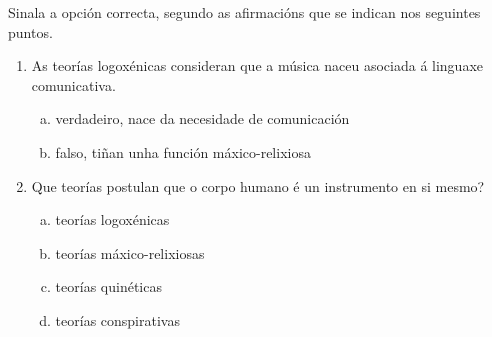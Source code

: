 
\begin{ejercicio}
Sinala a opción correcta, segundo as afirmacións que se indican nos seguintes puntos.
\begin{enumerate}[1)]
 \item 
 As teorías logoxénicas consideran que a música naceu asociada á linguaxe comunicativa.
  \begin{enumerate}[a)]
   \item \label{sol:3}
   verdadeiro, nace da necesidade de comunicación
   \item 
   falso, tiñan unha función máxico-relixiosa
  \end{enumerate}
  \item
  Que teorías postulan que o corpo humano é un instrumento en si mesmo? 
  \begin{enumerate}[a)]
   \item 
   teorías logoxénicas
   \item 
   teorías máxico-relixiosas
   \item \label{sol:4}
   teorías quinéticas
   \item 
   teorías conspirativas
  \end{enumerate}
 \end{enumerate}

\end{ejercicio}



